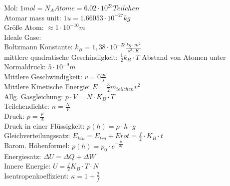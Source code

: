 \documentclass[A4]{scrreprt}
\begin{document}
    Mol: $1 mol = N_A Atome = 6.02\cdot 10^{23} Teilchen$\\
    Atomar mass unit: $1u = 1.66053 \cdot 10^{-27} kg$\\
    Größe Atom: $\approx 1\cdot 10^{-10} m$ \\
    Ideale Gase:\\
    Boltzmann Konstante: $k_B = 1,38 \cdot 10^{-23} \frac{kg \cdot m^2}{s^2 \cdot K}$\\
    mittlere quadratische Geschindigkeit: $\frac{1}{2} k_B \cdot T$
    Abstand von Atomen unter Normaldruck: $5\cdot 10^{-9} m$\\
    Mittlere Geschwindigkeit: $v = 0 \frac{m}{s}$\\
    Mittlere Kinetische Energie: $E = \frac{3}{2}m_{teilchen}v^2$\\
    Allg. Gasgleichung: $p\cdot V = N \cdot K_B \cdot T$\\
    Teilchendichte: $ n = \frac{N}{V}$\\
    Druck: $p = \frac{F}{A}$ \\
    Druck in einer Flüssigkeit: $p(h) = \rho \cdot h \cdot g$\\
    Gleichverteilungssatz: $E_{kin} = E_{tra} + E{rot} = \frac{f}{2} \cdot K_B \cdot t$\\
    Barom. Höhenformel: $p(h) = p_0 \cdot e^{-\frac{h}{h_0}}$\\
    Energiesatz: $\Delta U = \Delta Q + \Delta W$\\
    Innere Energie: $U = \frac{f}{2} K_B \cdot T \cdot N$\\
    Isentropenkoeffizient: $\kappa = 1+ \frac{2}{f}$
    \\ 
\end{document}
